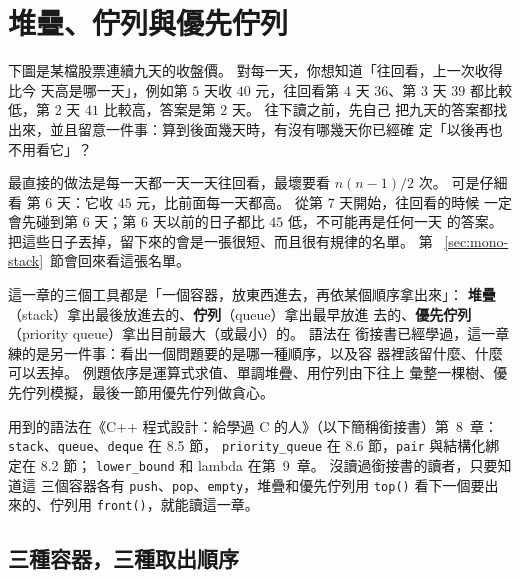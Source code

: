 \chapter{堆疊、佇列與優先佇列}
\label{ch:stacks}

下圖是某檔股票連續九天的收盤價。 對每一天，你想知道「往回看，上一次收得比今
天高是哪一天」，例如第 $5$ 天收 $40$ 元，往回看第 $4$ 天 $36$、第 $3$ 天
$39$ 都比較低，第 $2$ 天 $41$ 比較高，答案是第 $2$ 天。 往下讀之前，先自己
把九天的答案都找出來，並且留意一件事：算到後面幾天時，有沒有哪幾天你已經確
定「以後再也不用看它」？

\begin{center}
\label{fig:prices}
\end{center}

最直接的做法是每一天都一天一天往回看，最壞要看 $n(n-1)/2$ 次。 可是仔細看
第 $6$ 天：它收 $45$ 元，比前面每一天都高。 從第 $7$ 天開始，往回看的時候
一定會先碰到第 $6$ 天；第 $6$ 天以前的日子都比 $45$ 低，不可能再是任何一天
的答案。 把這些日子丟掉，留下來的會是一張很短、而且很有規律的名單。 第
~\ref{sec:mono-stack}~節會回來看這張名單。

這一章的三個工具都是「一個容器，放東西進去，再依某個順序拿出來」：
\textbf{堆疊}（stack）拿出最後放進去的、\textbf{佇列}（queue）拿出最早放進
去的、\textbf{優先佇列}（priority queue）拿出目前最大（或最小）的。 語法在
銜接書已經學過，這一章練的是另一件事：看出一個問題要的是哪一種順序，以及容
器裡該留什麼、什麼可以丟掉。 例題依序是運算式求值、單調堆疊、用佇列由下往上
彙整一棵樹、優先佇列模擬，最後一節用優先佇列做貪心。

用到的語法在《C++ 程式設計：給學過 C 的人》（以下簡稱銜接書）第~8~章：
\texttt{stack}、\texttt{queue}、\texttt{deque} 在 8.5 節，
\texttt{priority\_queue} 在 8.6 節，\texttt{pair} 與結構化綁定在 8.2 節；
\texttt{lower\_bound} 和 lambda 在第~9~章。 沒讀過銜接書的讀者，只要知道這
三個容器各有 \texttt{push}、\texttt{pop}、\texttt{empty}，堆疊和優先佇列用
\texttt{top()} 看下一個要出來的、佇列用 \texttt{front()}，就能讀這一章。

\section{三種容器，三種取出順序}
\label{sec:three-orders}

